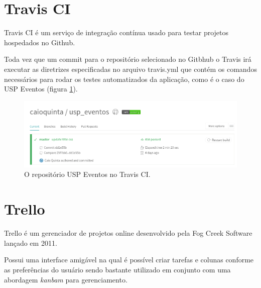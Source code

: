 \section{Travis CI}
\par Travis CI é um serviço de integração contínua usado para testar projetos hospedados no Github.
\par Toda vez que um commit para o repositório selecionado no Gitbhub o Travis irá executar as diretrizes especificadas no arquivo travis.yml que contém os comandos necessários para rodar os testes automatizados da aplicação, como é o caso do USP Eventos (figura \ref{fig:travis}).
\begin{figure}[htb]
\centering
\includegraphics[width=15cm]{figuras/travis}
\caption{\label{fig:travis} O repositório USP Eventos no Travis CI.}
\end{figure}

\section{Trello}
\par Trello é um gerenciador de projetos online desenvolvido pela Fog Creek Software lançado em 2011.
\par Possui uma interface amigável na qual é possível criar tarefas e colunas conforme as preferências do usuário sendo bastante utilizado em conjunto com uma abordagem \emph{kanbam} para gerenciamento.

